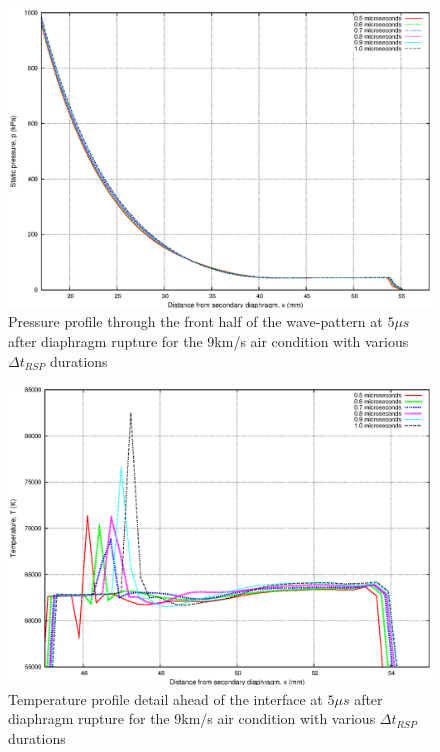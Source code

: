 \documentclass[a4paper,10pt]{article}
\begin{document}
\begin{figure}[hb]
\centering
\includegraphics[scale=0.8]{figs/air_vrspdts_press_profile.eps}
\caption{Pressure profile through the front half of the wave-pattern at $5 \mu s$ after diaphragm rupture for the 9km/s air condition with various $\Delta t_{RSP}$ durations}
\label{fig:air_various_rsp_dts:a}
\end{figure}

\begin{figure}[hc]
\centering
\includegraphics[scale=0.8]{figs/air_vrspdts_temp_profile_detail.eps}
\caption{Temperature profile detail ahead of the interface at $5 \mu s$ after diaphragm rupture for the 9km/s air condition with various $\Delta t_{RSP}$ durations}
\label{fig:air_various_rsp_dts:b}
\end{figure}
\end{document}
